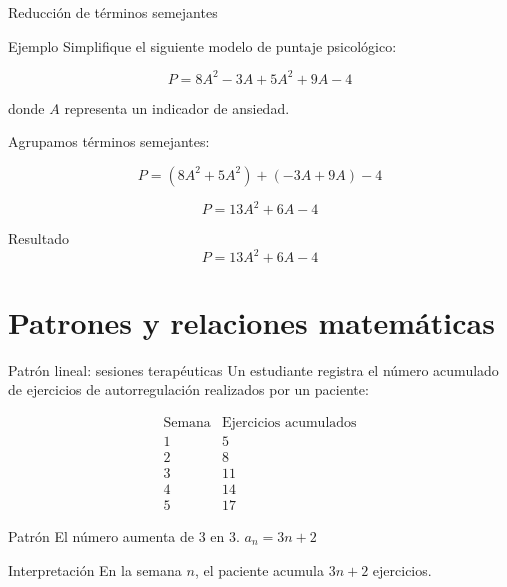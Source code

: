 \documentclass[aspectratio=169]{beamer}
\begin{document}
	
	\begin{frame}{Reducción de términos semejantes}
		\begin{exampleblock}{Ejemplo}
			Simplifique el siguiente modelo de puntaje psicológico:
			
			\[
			P=8A^2-3A+5A^2+9A-4
			\]
			
			donde \(A\) representa un indicador de ansiedad.
		\end{exampleblock}
		
		\pause
		
		Agrupamos términos semejantes:
		
		\[
		P=(8A^2+5A^2)+(-3A+9A)-4
		\]
		
		\pause
		
		\[
		P=13A^2+6A-4
		\]
		
		\pause
		
		\begin{block}{Resultado}
			\[
			P=13A^2+6A-4
			\]
		\end{block}
	\end{frame}
	
	\section{Patrones y relaciones matemáticas}
	
	\begin{frame}{Patrón lineal: sesiones terapéuticas}
		Un estudiante registra el número acumulado de ejercicios de autorregulación realizados por un paciente:
		
		\[
		\begin{array}{c|c}
			\text{Semana} & \text{Ejercicios acumulados} \\
			\hline
			1 & 5 \\
			2 & 8 \\
			3 & 11 \\
			4 & 14 \\
			5 & 17
		\end{array}
		\]
		
		\pause
		
		\begin{block}{Patrón}
			El número aumenta de \(3\) en \(3\). \qquad  $a_n=3n+2$
		\end{block}
		
		\pause
		
		\begin{block}{Interpretación}
			En la semana \(n\), el paciente acumula \(3n+2\) ejercicios.
		\end{block}
	\end{frame}
	
\end{document}

